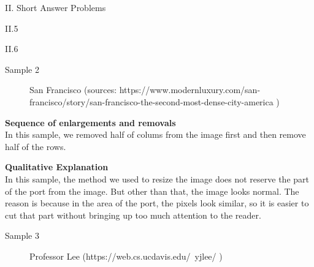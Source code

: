 \documentclass[a4paper,12pt]{article}
\begin{document}
\begin{section}{II. Short Answer Problems}
\begin{subsection}{II.5}
\begin{subsection}{II.6}
\clearpage
\begin{subsubsection}{Sample 2}
\begin{figure}[!htb]
        \caption{San Francisco (sources: https://www.modernluxury.com/san-francisco/story/san-francisco-the-second-most-dense-city-america
)
}
\end{figure}

\textbf{Sequence of enlargements and removals}\\
In this sample, we removed half of colums from the image first and then remove half of the rows.

\textbf{Qualitative Explanation}\\
In this sample, the method we used to resize the image does not reserve the part of the port from the image. But other than that, the image looks normal. The reason is because in the area of the port, the pixels look similar, so it is easier to cut that part without bringing up too much attention to the reader.

\end{subsubsection}



\clearpage
\begin{subsubsection}{Sample 3}
\begin{figure}[!htb]
        \caption{Professor Lee (https://web.cs.ucdavis.edu/~yjlee/
)
}
\end{figure}


\end{subsubsection}
\end{subsection}
\end{subsection}
\end{section}
\end{document}
